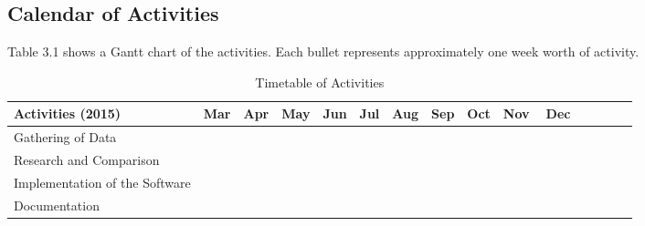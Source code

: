 \pagebreak
\begin{landscape}
\section{Calendar of Activities}

Table 3.1 shows a Gantt chart of the activities. Each bullet represents approximately one week worth of activity.

%
%
\newcommand{\weekone}{\textbullet}
\newcommand{\weektwo}{\textbullet \textbullet}
\newcommand{\weekthree}{\textbullet \textbullet \textbullet}
\newcommand{\weekfour}{\textbullet \textbullet \textbullet \textbullet}

%
%
\begin{comment}
   \newcommand{\weekone}{$\star$}
   \newcommand{\weektwo}{$\star \star$}
   \newcommand{\weekthree}{$\star \star \star$}
   \newcommand{\weekfour}{$\star \star \star \star$ }
\end{comment}



\begin{table}[ht]   %
\centering
\caption{Timetable of Activities} \vspace{0.25em}
\begin{tabular}{|p{2in}|c|c|c|c|c|c|c|c|c|c|c|c|c|c|} \hline
\centering Activities (2015)				& Mar		&Apr		& May		& Jun		& Jul		& Aug		& Sep		& Oct		& Nov		& Dec			\\ \hline
Gathering of Data							& \weekfour &\weektwo~~~&~\weekthree&			&			&			&			&			&			&				\\ \hline
Research and Comparison						& \weekfour &\weektwo~~~&~\weekthree&			&			&			&			&			&			&				\\ \hline
Implementation of the Software				&			&			&~~~\weektwo& \weekfour & \weekfour & \weekfour & \weekfour & \weekfour	& \weekfour	&\weekone~~~~~	\\ \hline
Documentation								& \weekfour &\weektwo~~~&~\weekthree& \weekfour & \weekfour & \weekfour & \weekfour & \weekfour	& \weekfour	&\weekone~~~~~	\\ \hline
\end{tabular}
\label{tab:timetableactivities2015}
\end{table}


\end{landscape}
